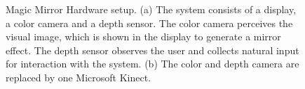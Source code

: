\begin{figure}
	\centering
	\caption[Magic Mirror Hardware setup.]{Magic Mirror Hardware setup. (a) The system consists of a display, a color camera and a depth sensor. The color camera perceives the visual image, which is shown in the display to generate a mirror effect. The depth sensor observes the user and collects natural input for interaction with the system. (b) The color and depth camera are replaced by one Microsoft Kinect.}
	\label{fig:3-MMC:hardware}
\end{figure}

